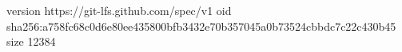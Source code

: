 version https://git-lfs.github.com/spec/v1
oid sha256:a758fc68c0d6e80ee435800bfb3432e70b357045a0b73524cbbdc7c22c430b45
size 12384
